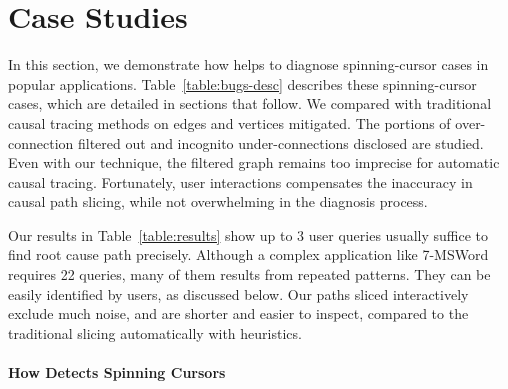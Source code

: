 \section{Case Studies}\label{sec:casestudy}

In this section, we demonstrate how \xxx helps to diagnose \nbug spinning-cursor
cases in popular applications. Table~\ref{table:bugs-desc} describes these
spinning-cursor cases, which are detailed in sections that follow. We compared
\xxx with traditional causal tracing methods on edges and vertices mitigated.
The portions of over-connection filtered out and incognito under-connections
disclosed are studied. Even with our technique, the filtered graph remains
too imprecise for automatic causal tracing. Fortunately, user interactions
compensates the inaccuracy in causal path slicing, while not overwhelming in the
diagnosis process.

Our results in Table~\ref{table:results} show up to 3 user queries usually
suffice to find root cause path precisely. Although a complex application like
7-MSWord requires 22 queries, many of them results from repeated patterns.
They can be easily identified by users, as discussed below. Our paths sliced
interactively exclude much noise, and are shorter and easier to inspect,
compared to the traditional slicing automatically with heuristics.

%

\paragraph{How \xxx Detects Spinning Cursors}

